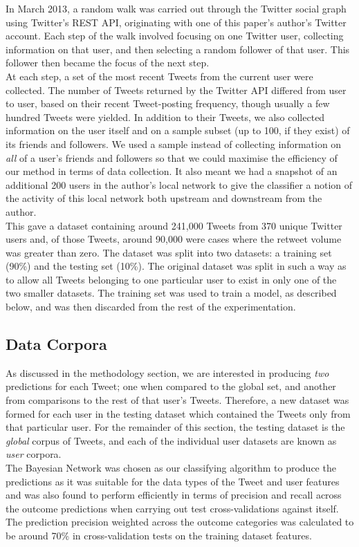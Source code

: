 \begin{enumerate}
In March 2013, a random walk was carried out through the Twitter social graph using Twitter's REST API, originating with one of this paper's author's Twitter account. Each step of the walk involved focusing on one Twitter user, collecting information on that user, and then selecting a random follower of that user. This follower then became the focus of the next step.\\
At each step, a set of the most recent Tweets from the current user were collected. The number of Tweets returned by the Twitter API differed from user to user, based on their recent Tweet-posting frequency, though usually a few hundred Tweets were yielded. In addition to their Tweets, we also collected information on the user itself and on a sample subset (up to 100, if they exist) of its friends and followers. We used a sample instead of collecting information on \textit{all} of a user's friends and followers so that we could maximise the efficiency of our method in terms of data collection. It also meant we had a snapshot of an additional 200 users in the author's local network to give the classifier a notion of the activity of this local network both upstream and downstream from the author.\\
This gave a dataset containing around 241,000 Tweets from 370 unique Twitter users and, of those Tweets, around 90,000 were cases where the retweet volume was greater than zero. The dataset was split into two datasets: a training set (90\%) and the testing set (10\%). The original dataset was split in such a way as to allow all Tweets belonging to one particular user to exist in only one of the two smaller datasets. The training set was used to train a model, as described below, and was then discarded from the rest of the experimentation.

\subsection{Data Corpora}
As discussed in the methodology section, we are interested in producing \textit{two} predictions for each Tweet; one when compared to the global set, and another from comparisons to the rest of that user's Tweets. Therefore, a new dataset was formed for each user in the testing dataset which contained the Tweets only from that particular user. For the remainder of this section, the testing dataset is the \textit{global} corpus of Tweets, and each of the individual user datasets are known as \textit{user} corpora.\\
The Bayesian Network was chosen as our classifying algorithm to produce the predictions as it was suitable for the data types of the Tweet and user features and was also found to perform efficiently in terms of precision and recall across the outcome predictions when carrying out test cross-validations against itself. The prediction precision weighted across the outcome categories was calculated to be around 70\% in cross-validation tests on the training dataset features.


\end{enumerate}
